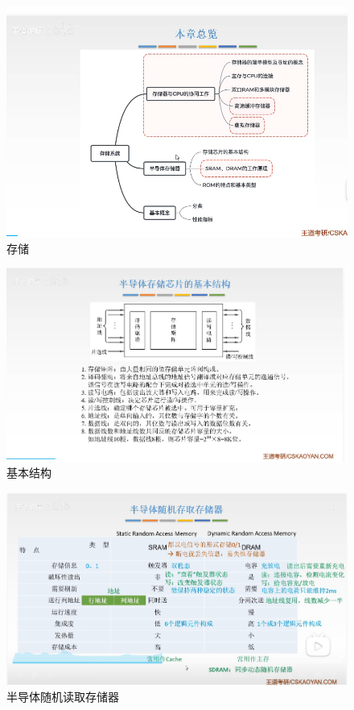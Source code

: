 \documentclass[12pt]{ctexart}
\begin{document}
\begin{figure}[htbp]
    \centering
    \includegraphics[scale=0.6]{存储.png}
    \caption{存储}
    \end{figure}
\begin{figure}[htbp]
    \centering
    \includegraphics[scale=0.6]{基本结构.png}
    \caption{基本结构}
    \end{figure}
\begin{figure}[htbp]
    \centering
    \includegraphics[scale=0.6]{半导体随机读取存储器.png}
    \caption{半导体随机读取存储器}
    \end{figure}
\end{document}
